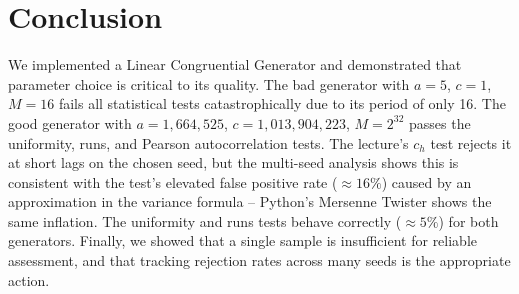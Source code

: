 \section*{Conclusion}

We implemented a Linear Congruential Generator and demonstrated that
parameter choice is critical to its quality. The bad generator with
$a = 5$, $c = 1$, $M = 16$ fails all statistical tests catastrophically
due to its period of only 16. The good generator with
$a = 1{,}664{,}525$, $c = 1{,}013{,}904{,}223$, $M = 2^{32}$ passes the
uniformity, runs, and Pearson autocorrelation tests. The lecture's $c_h$
test rejects it at short lags on the chosen seed, but the multi-seed
analysis shows this is consistent with the test's elevated false positive
rate ($\approx 16\%$) caused by an approximation in the variance formula
-- Python's Mersenne Twister shows the same inflation. The uniformity and
runs tests behave correctly ($\approx 5\%$) for both generators. Finally,
we showed that a single sample is insufficient for reliable assessment, and
that tracking rejection rates across many seeds is the appropriate action.